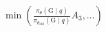 \documentclass[preview]{standalone}
\begin{document}
\begin{align*}
\min \left( \frac{\pi_\theta(\text{G} \mid q)}{\pi_{\theta_{\text{old}}}(\text{G} \mid q)} A_3, \dots \right)
\end{align*}
\end{document}
